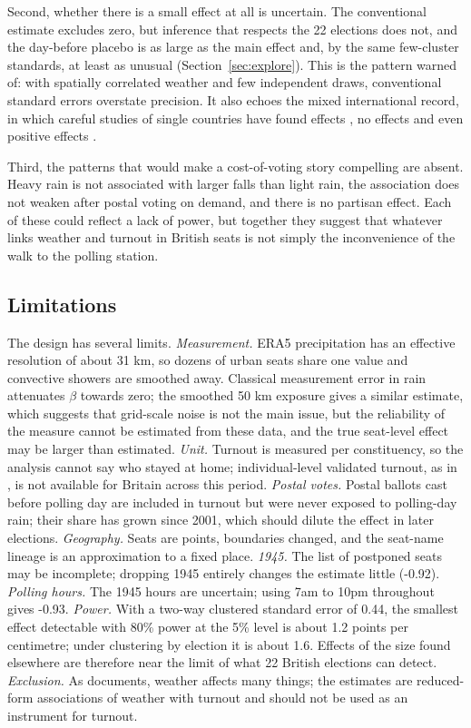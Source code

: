 \documentclass[11pt,a4paper]{article}
\begin{document}
Second, whether there is a small effect at all is uncertain. The conventional estimate excludes zero, but inference that respects the 22 elections does not, and the day-before placebo is as large as the main effect and, by the same few-cluster standards, at least as unusual (Section~\ref{sec:explore}). This is the pattern \citet{cooperman2017} warned of: with spatially correlated weather and few independent draws, conventional standard errors overstate precision. It also echoes the mixed international record, in which careful studies of single countries have found effects \citep{damsbo2023,eisinga2012turnout}, no effects \citep{persson2014} and even positive effects \citep{lind2020}.

Third, the patterns that would make a cost-of-voting story compelling are absent. Heavy rain is not associated with larger falls than light rain, the association does not weaken after postal voting on demand, and there is no partisan effect. Each of these could reflect a lack of power, but together they suggest that whatever links weather and turnout in British seats is not simply the inconvenience of the walk to the polling station.

\subsection{Limitations}
The design has several limits. \emph{Measurement.} ERA5 precipitation has an effective resolution of about 31 km, so dozens of urban seats share one value and convective showers are smoothed away. Classical measurement error in rain attenuates $\beta$ towards zero; the smoothed 50 km exposure gives a similar estimate, which suggests that grid-scale noise is not the main issue, but the reliability of the measure cannot be estimated from these data, and the true seat-level effect may be larger than estimated. \emph{Unit.} Turnout is measured per constituency, so the analysis cannot say who stayed at home; individual-level validated turnout, as in \citet{damsbo2023}, is not available for Britain across this period. \emph{Postal votes.} Postal ballots cast before polling day are included in turnout but were never exposed to polling-day rain; their share has grown since 2001, which should dilute the effect in later elections. \emph{Geography.} Seats are points, boundaries changed, and the seat-name lineage is an approximation to a fixed place. \emph{1945.} The list of postponed seats may be incomplete; dropping 1945 entirely changes the estimate little (-0.92). \emph{Polling hours.} The 1945 hours are uncertain; using 7am to 10pm throughout gives -0.93. \emph{Power.} With a two-way clustered standard error of 0.44, the smallest effect detectable with 80\% power at the 5\% level is about 1.2 points per centimetre; under clustering by election it is about 1.6. Effects of the size found elsewhere are therefore near the limit of what 22 British elections can detect. \emph{Exclusion.} As \citet{mellon2025} documents, weather affects many things; the estimates are reduced-form associations of weather with turnout and should not be used as an instrument for turnout.
\end{document}
